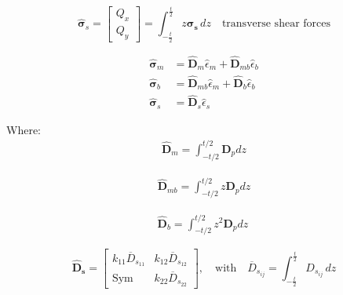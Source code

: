 \begin{equation}
    \hat{\boldsymbol{\sigma}}_{s} = \begin{bmatrix}
    Q_x \\
    Q_y
    \end{bmatrix} = \int_{-\frac{t}{2}}^{\frac{t}{2}} z \boldsymbol{\sigma}_{\mathbf{s}} \, dz \quad \text{transverse shear forces}
\end{equation}
    
\begin{align}
    \hat{\boldsymbol{\sigma}}_{m} &= {\hat{\mathbf{D}}}_{m}{\hat{\epsilon}}_{m} + {\hat{\mathbf{D}}}_{mb}{\hat{\epsilon}}_{b} \\
    \hat{\boldsymbol{\sigma}}_{b} &= {\hat{\mathbf{D}}}_{mb}{\hat{\epsilon}}_{m} + {\hat{\mathbf{D}}}_{b}{\hat{\epsilon}}_{b} \\
    \hat{\boldsymbol{\sigma}}_{s} &= {\hat{\mathbf{D}}}_{s}{\hat{\epsilon}}_{s}
\end{align}
    

Where:
\begin{equation}
    \label{eq:Dm}
\begin{array}{r}
{\hat{\mathbf{D}}}_{m} = \int_{- t/2}^{t/2}{\mathbf{D}_{p}dz} 
\end{array}
\end{equation}


\begin{equation} 
    \label{eq:Dmb}  
\begin{array}{r}
{\hat{\mathbf{D}}}_{mb} = \int_{- t/2}^{t/2}{z\mathbf{D}_{p}dz}
\end{array}
\end{equation}

\begin{equation}
    \label{eq:Db}
\begin{array}{r}
{\hat{\mathbf{D}}}_{b} = \int_{- t/2}^{t/2}{z^{2}\mathbf{D}_{p}dz}\
\end{array}
\end{equation}


\begin{equation}
    \label{eq:Dshear}    
\hat{\mathbf{D}}_{\mathbf{s}} =
\begin{bmatrix}
k_{11} \overline{D}_{s_{11}} & k_{12} \overline{D}_{s_{12}} \\
\text{Sym} & k_{22} \overline{D}_{s_{22}}
\end{bmatrix}, \quad
\text{with} \quad
\overline{D}_{s_{ij}} = \int_{- \frac{t}{2}}^{\frac{t}{2}} D_{s_{ij}} \, dz
\end{equation}




